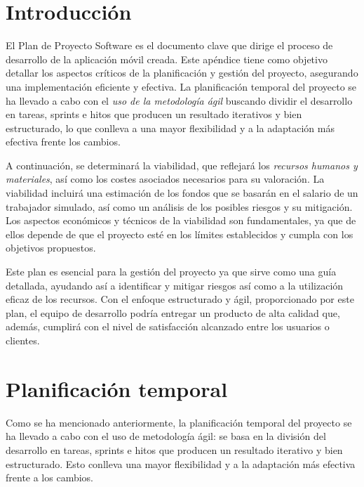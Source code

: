 
\section{Introducción}
El Plan de Proyecto Software es el documento clave que dirige el proceso de desarrollo de la aplicación móvil creada. Este apéndice tiene como objetivo detallar los aspectos críticos de la planificación y gestión del proyecto, asegurando una implementación eficiente y efectiva.
La planificación temporal del proyecto se ha llevado a cabo con el \emph{uso de la metodología ágil} buscando dividir el desarrollo en tareas, sprints e hitos que producen un resultado iterativos y bien estructurado, lo que conlleva a una mayor flexibilidad y a la adaptación más efectiva frente los cambios. 

A continuación, se determinará la viabilidad, que reflejará los \emph{recursos humanos y materiales}, así como los costes asociados necesarios para su valoración. La viabilidad incluirá una estimación de los fondos que se basarán en el salario de un trabajador simulado, así como un análisis de los posibles riesgos y su mitigación. Los aspectos económicos y técnicos de la viabilidad son fundamentales, ya que de ellos depende de que el proyecto esté en los límites establecidos y cumpla con los objetivos propuestos.

Este plan es esencial para la gestión del proyecto ya que sirve como una guía detallada, ayudando así a identificar y mitigar riesgos así como a la utilización eficaz de los recursos. Con el enfoque estructurado y ágil, proporcionado por este plan, el equipo de desarrollo podría entregar un producto de alta calidad que, además, cumplirá con el nivel de satisfacción alcanzado entre los usuarios o clientes. 
\section{Planificación temporal}
 Como se ha mencionado anteriormente, la planificación temporal del proyecto se ha llevado a cabo con el uso de metodología ágil: se basa en la división del desarrollo en tareas, sprints e hitos que producen un resultado iterativo y bien estructurado. Esto conlleva una mayor flexibilidad y a la adaptación más efectiva frente a los cambios.

